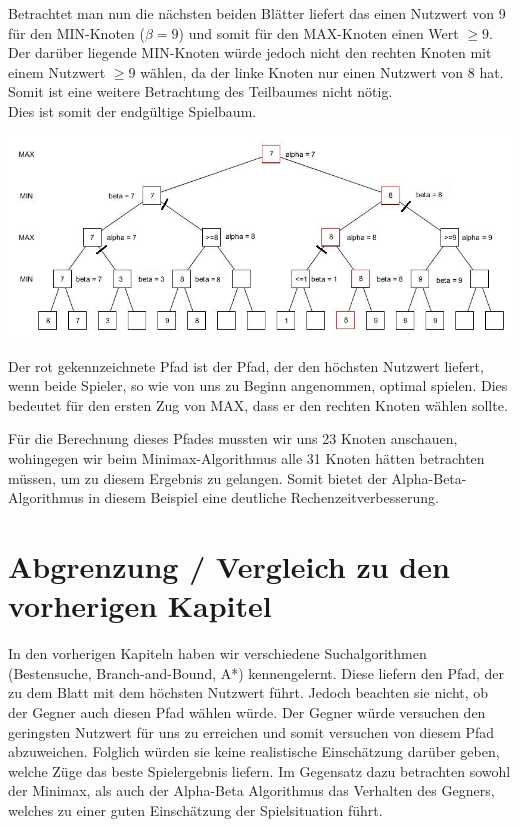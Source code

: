  Betrachtet man nun die nächsten beiden Blätter liefert das einen Nutzwert von 9 für den MIN-Knoten ($\beta =9$) und somit für den MAX-Knoten einen Wert $\ge9$. Der darüber liegende MIN-Knoten würde jedoch nicht den rechten Knoten mit einem Nutzwert $\ge9$ wählen, da der linke Knoten nur einen Nutzwert von 8 hat. Somit ist eine weitere Betrachtung des Teilbaumes nicht nötig.\\
 Dies ist somit der endgültige Spielbaum.

 \begin{center}
 	\includegraphics[width = 12 cm]{chapters/minimax/jpg/Alpha-beta10.jpg}
 \end{center}

 Der rot gekennzeichnete Pfad ist der Pfad, der den höchsten Nutzwert liefert, wenn beide Spieler, so wie von uns zu Beginn angenommen, optimal spielen. Dies bedeutet für den ersten Zug von MAX, dass er den rechten Knoten wählen sollte.

 Für die Berechnung dieses Pfades mussten wir uns 23 Knoten anschauen, wohingegen wir beim Minimax-Algorithmus alle 31 Knoten hätten betrachten müssen, um zu diesem Ergebnis zu gelangen. Somit bietet der Alpha-Beta-Algorithmus in diesem Beispiel eine deutliche Rechenzeitverbesserung.

\section{Abgrenzung / Vergleich zu den vorherigen Kapitel}

In den vorherigen Kapiteln haben wir verschiedene Suchalgorithmen (Bestensuche, Branch-and-Bound, A*) kennengelernt. Diese liefern den Pfad, der zu dem Blatt mit dem höchsten Nutzwert führt. Jedoch beachten sie nicht, ob der Gegner auch diesen Pfad wählen würde. Der Gegner würde versuchen den geringsten Nutzwert für uns zu erreichen und somit versuchen von diesem Pfad abzuweichen. Folglich würden sie keine realistische Einschätzung darüber geben, welche Züge das beste Spielergebnis liefern. Im Gegensatz dazu betrachten sowohl der Minimax, als auch der Alpha-Beta Algorithmus das Verhalten des Gegners, welches zu einer guten Einschätzung der Spielsituation führt.



